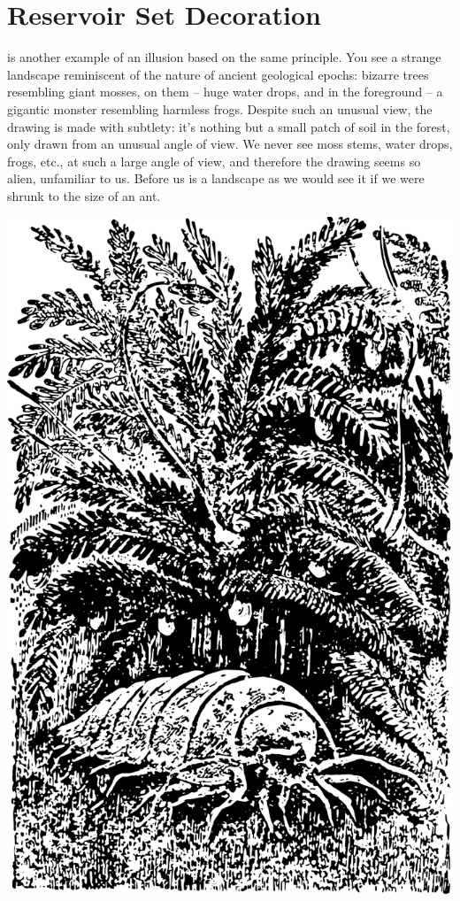 \section{Reservoir Set Decoration}
\label{sec-3.6}


 is another example of an illusion based on the same principle. You see a strange landscape reminiscent of the nature of ancient geological epochs: bizarre trees resembling giant mosses, on them -- huge water drops, and in the foreground -- a gigantic monster resembling harmless frogs. Despite such an unusual view, the drawing is made with subtlety: it's nothing but a small patch of soil in the forest, only drawn from an unusual angle of view. We never see moss stems, water drops, frogs, etc., at such a large angle of view, and therefore the drawing seems so alien, unfamiliar to us. Before us is a landscape as we would see it if we were shrunk to the size of an ant. 

\begin{marginfigure}%
\centering
\includegraphics[width=\textwidth]{figures/ch-03/fig-066.pdf}
\end{marginfigure}


